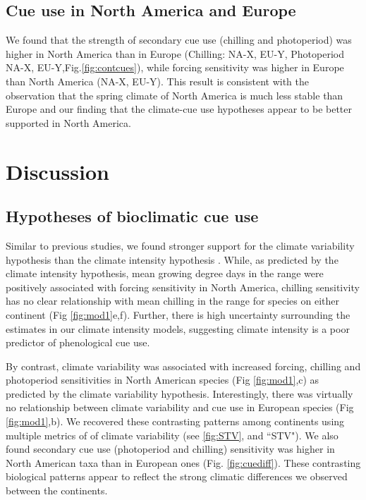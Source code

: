 \documentclass[12pt]{article}\usepackage[]{graphicx}\usepackage[]{color}
\begin{document}
\subsection{Cue use in North America and Europe}
We found that the strength of secondary cue use (chilling and photoperiod) was higher in North America than in Europe (Chilling: NA-X, EU-Y, Photoperiod NA-X, EU-Y,Fig.\ref{fig:contcues}), while forcing sensitivity was higher in Europe than North America (NA-X, EU-Y). This result is consistent with the observation that the spring climate of North America is much less stable than Europe and our finding that the climate-cue use hypotheses appear to be better supported in North America.

\section*{Discussion}
\subsection*{Hypotheses of bioclimatic cue use}
Similar to previous studies, we found stronger support for the climate variability hypothesis than the climate intensity hypothesis \citep{}. While, as predicted by the climate intensity hypothesis, mean growing degree days in the range were positively associated with forcing sensitivity in North America, chilling sensitivity has no clear relationship with mean chilling in the range for species on either continent (Fig \ref{fig:mod1}e,f).  Further, there is high uncertainty surrounding the estimates in our climate intensity models, suggesting climate intensity is a poor predictor of phenological cue use.

\noindent By contrast, climate variability was associated with increased forcing, chilling and photoperiod sensitivities in North American species (Fig \ref{fig:mod1},c) as predicted by the climate variability hypothesis. Interestingly, there was virtually no relationship between climate variability and cue use in European species (Fig \ref{fig:mod1},b). We recovered these contrasting patterns among continents using multiple metrics of of climate variability (see \ref{fig:STV}, and ``STV"). We also found secondary cue use (photoperiod and chilling) sensitivity was higher in North American taxa than in European ones (Fig. \ref{fig:cuediff}). These contrasting biological patterns appear to reflect the strong climatic differences we observed between the continents.
\end{document}
